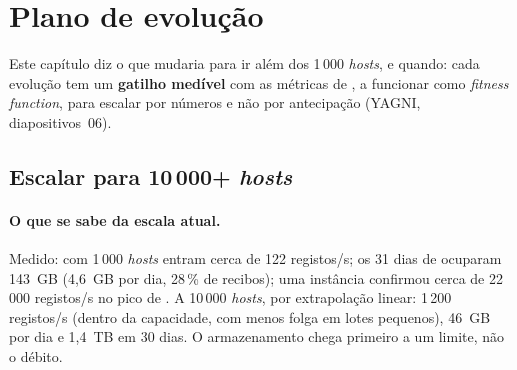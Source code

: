 \section{Plano de evolução}
\label{sec:evolucao}

Este capítulo diz o que mudaria para ir além dos 1\,000 \emph{hosts}, e quando: cada evolução tem um
\textbf{gatilho medível} com as métricas de , a funcionar como \emph{fitness function}, para escalar por
números e não por antecipação (YAGNI, diapositivos~06).

\subsection{Escalar para 10\,000+ \emph{hosts}}

\paragraph{O que se sabe da escala atual.}
Medido: com 1\,000 \emph{hosts} entram cerca de 122 registos/s; os 31 dias de  ocuparam 143~GB (4,6~GB por
dia, 28\,\% de recibos); uma instância confirmou cerca de 22\,000 registos/s no pico de . A 10\,000
\emph{hosts}, por extrapolação linear: 1\,200 registos/s (dentro da capacidade, com menos folga em lotes pequenos),
46~GB por dia e 1,4~TB em 30 dias. O armazenamento chega primeiro a um limite, não o débito.

